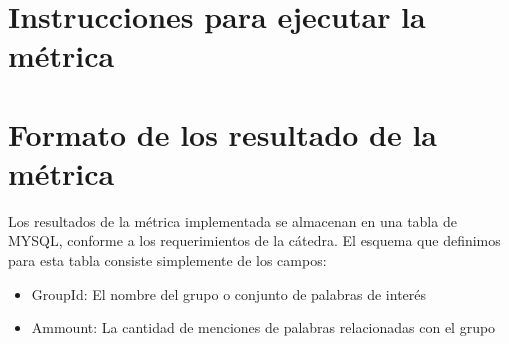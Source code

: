 \documentclass[a4paper,10pt]{article}
\begin{document}
\section{Instrucciones para ejecutar la métrica}

\small
\section{Formato de los resultado de la métrica}

Los resultados de la métrica implementada se almacenan en una tabla de MYSQL, conforme a los requerimientos de la cátedra. El esquema que definimos para esta tabla consiste
simplemente de los campos:

\begin{itemize}
    \item GroupId: El nombre del grupo o conjunto de palabras de interés
    \item Ammount: La cantidad de menciones de palabras relacionadas con el grupo
\end{itemize}
\end{document}
